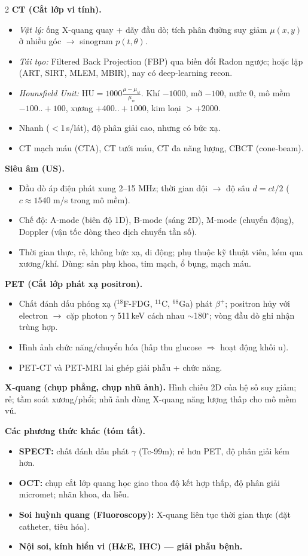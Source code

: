 \begin{paracol}{2}
\textbf{CT (Cắt lớp vi tính).}
\begin{itemize}[leftmargin=*,nosep]
  \item \emph{Vật lý:} ống X-quang quay + dãy đầu dò; tích phân đường suy giảm $\mu(x,y)$ ở nhiều góc $\to$ sinogram $p(t,\theta)$.
  \item \emph{Tái tạo:} Filtered Back Projection (FBP) qua biến đổi Radon ngược; hoặc lặp (ART, SIRT, MLEM, MBIR), nay có deep-learning recon.
  \item \emph{Hounsfield Unit:} $\mathrm{HU}=1000\frac{\mu-\mu_w}{\mu_w}$. Khí $-1000$, mỡ $-100$, nước $0$, mô mềm $-100..+100$, xương $+400..+1000$, kim loại $>+2000$.
  \item Nhanh ($<$1\,s/lát), độ phân giải cao, nhưng có bức xạ.
  \item CT mạch máu (CTA), CT tưới máu, CT đa năng lượng, CBCT (cone-beam).
\end{itemize}

\textbf{Siêu âm (US).}
\begin{itemize}[leftmargin=*,nosep]
  \item Đầu dò áp điện phát xung 2--15 MHz; thời gian dội $\to$ độ sâu $d=ct/2$ ($c\!\approx\!1540$ m/s trong mô mềm).
  \item Chế độ: A-mode (biên độ 1D), B-mode (sáng 2D), M-mode (chuyển động), Doppler (vận tốc dòng theo dịch chuyển tần số).
  \item Thời gian thực, rẻ, không bức xạ, di động; phụ thuộc kỹ thuật viên, kém qua xương/khí. Dùng: sản phụ khoa, tim mạch, ổ bụng, mạch máu.
\end{itemize}

\textbf{PET (Cắt lớp phát xạ positron).}
\begin{itemize}[leftmargin=*,nosep]
  \item Chất đánh dấu phóng xạ ($^{18}$F-FDG, $^{11}$C, $^{68}$Ga) phát $\beta^+$; positron hủy với electron $\to$ cặp photon $\gamma$ 511\,keV cách nhau $\sim$180$^\circ$; vòng đầu dò ghi nhận trùng hợp.
  \item Hình ảnh chức năng/chuyển hóa (hấp thu glucose $\Rightarrow$ hoạt động khối u).
  \item PET-CT và PET-MRI lai ghép giải phẫu + chức năng.
\end{itemize}

\textbf{X-quang (chụp phẳng, chụp nhũ ảnh).} Hình chiếu 2D của hệ số suy giảm; rẻ; tầm soát xương/phổi; nhũ ảnh dùng X-quang năng lượng thấp cho mô mềm vú.

\textbf{Các phương thức khác (tóm tắt).}
\begin{itemize}[leftmargin=*,nosep]
  \item \textbf{SPECT:} chất đánh dấu phát $\gamma$ (Tc-99m); rẻ hơn PET, độ phân giải kém hơn.
  \item \textbf{OCT:} chụp cắt lớp quang học giao thoa độ kết hợp thấp, độ phân giải micromet; nhãn khoa, da liễu.
  \item \textbf{Soi huỳnh quang (Fluoroscopy):} X-quang liên tục thời gian thực (đặt catheter, tiêu hóa).
  \item \textbf{Nội soi, kính hiển vi (H\&E, IHC) — giải phẫu bệnh.}
\end{itemize}


\end{paracol}
